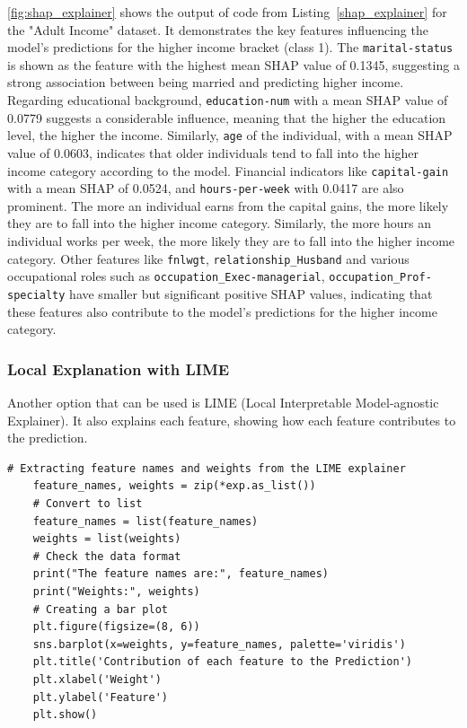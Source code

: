\documentclass[10pt,journal,compsoc]{IEEEtran}
\begin{document}
\autoref{fig:shap_explainer} shows the output of code from Listing~\ref{shap_explainer} for the "Adult Income" dataset. It demonstrates the key features influencing the model's predictions for the higher income bracket (class 1).
The \texttt{marital-status} is shown as the feature with the highest mean SHAP value of 0.1345, suggesting a strong association between being married and predicting higher income.
Regarding educational background, \texttt{education-num} with a mean SHAP value of 0.0779 suggests a considerable influence, meaning that the higher the education level, the higher the income. Similarly, 
\texttt{age} of the individual, with a mean SHAP value of 0.0603, indicates that older individuals tend to fall into the higher income category according to the model.
Financial indicators like \texttt{capital-gain} with a mean SHAP of 0.0524, and \texttt{hours-per-week} with 0.0417 are also prominent.
The more an individual earns from the capital gains, the more likely they are to fall into the higher income category. Similarly, the more hours an individual works per week, the more likely they are to fall into the higher income category.
Other features like \texttt{fnlwgt}, \texttt{relationship\_Husband} and various occupational roles such as \texttt{occupation\_Exec-managerial}, \texttt{occupation\_Prof-specialty} have smaller but significant positive SHAP values, indicating that these features also contribute to the model's predictions for the higher income category.


\subsubsection{Local Explanation with LIME}

Another option that can be used is LIME (Local Interpretable Model-agnostic Explainer). It also explains each feature, showing how each feature contributes to the prediction.


\begin{lstlisting}[caption=LIME Explainer , label=lime_explainer]
    # Extracting feature names and weights from the LIME explainer
    feature_names, weights = zip(*exp.as_list())    
    # Convert to list
    feature_names = list(feature_names)
    weights = list(weights)    
    # Check the data format
    print("The feature names are:", feature_names)
    print("Weights:", weights)    
    # Creating a bar plot
    plt.figure(figsize=(8, 6))
    sns.barplot(x=weights, y=feature_names, palette='viridis')
    plt.title('Contribution of each feature to the Prediction')
    plt.xlabel('Weight')
    plt.ylabel('Feature')
    plt.show()
\end{lstlisting}
\end{document}
